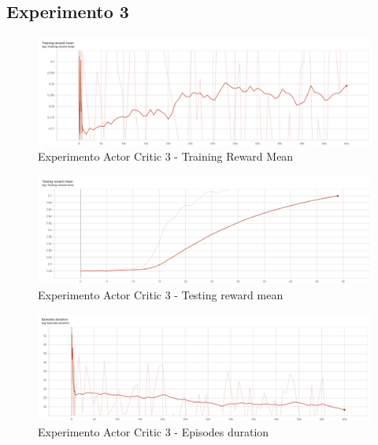 \subsection{Experimento 3}
\label{resultados-actor-critic-experimento-3}


\begin{figure}[H]
	\centering
	\includegraphics[width=1\textwidth]{figuras/experiments/policy_gradient/policy_gradient_normalized_image_reward_50_epochs/training_reward_mean.png}
	\caption[Experimento Actor Critic 3 - Training Reward Mean]{Experimento Actor Critic 3 - Training Reward Mean}
	\label{fig-experimento-actor-critic-3-training-reward-mean}
\end{figure}
\begin{figure}[H]
	\centering
	\includegraphics[width=1\textwidth]{figuras/experiments/policy_gradient/policy_gradient_normalized_image_reward_50_epochs/testing_reward_mean.png}
	\caption[Experimento Actor Critic 3 - Testing reward mean]{Experimento Actor Critic 3 - Testing reward mean}
	\label{fig-experimento-actor-critic-3-testing-reward-mean}
\end{figure}
\begin{figure}[H]
	\centering
	\includegraphics[width=1\textwidth]{figuras/experiments/policy_gradient/policy_gradient_normalized_image_reward_50_epochs/episodes_duration.png}
	\caption[Experimento Actor Critic 3 - Episodes duration]{Experimento Actor Critic 3 - Episodes duration}
	\label{fig-experimento-actor-critic-3-episodes-duration}
\end{figure}

